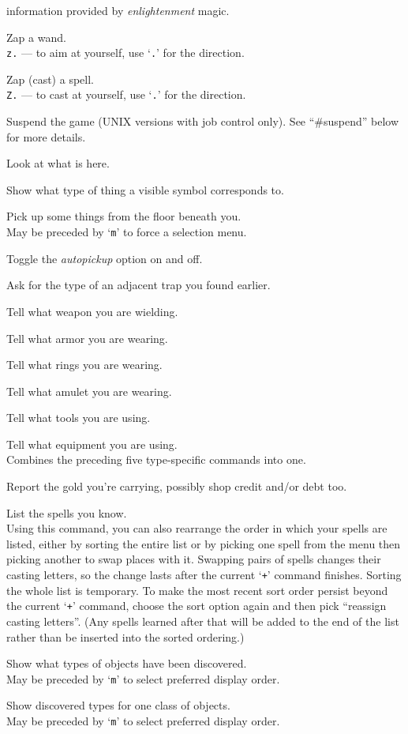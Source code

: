 \documentclass[titlepage]{article}
\begin{document}
\begin{description}[font=\mdseries\ttfamily]
information provided by \textit{enlightenment} magic.
\item[z]
Zap a wand.\\
\texttt{z.} --- to aim at yourself, use `\texttt{.}' for the direction.
\item[Z]
Zap (cast) a spell.\\
\texttt{Z.} --- to cast at yourself, use `\texttt{.}' for the direction.
\item[\textasciicircum Z]
Suspend the game (UNIX versions with job control only).
See ``\#suspend'' below for more details.
\item[:]
Look at what is here.
\item[;]
Show what type of thing a visible symbol corresponds to.
\item[,]
Pick up some things from the floor beneath you.\\
May be preceded by `\texttt{m}' to force a selection menu.
\item[@]
Toggle the \textit{autopickup} option on and off.
\item[\textasciicircum]
Ask for the type of an adjacent trap you found earlier.
\item[)]
Tell what weapon you are wielding.
\item[{]}]
Tell what armor you are wearing.
\item[=]
Tell what rings you are wearing.
\item["]
Tell what amulet you are wearing.
\item[(]
Tell what tools you are using.
\item[*]
Tell what equipment you are using.\\
Combines the preceding five type-specific
commands into one.
\item[\$]
Report the gold you're carrying, possibly shop credit and/or debt too.
\item[+]
List the spells you know.\\
Using this command, you can also rearrange
the order in which your spells are listed, either by sorting the entire
list or by picking one spell from the menu then picking another to swap
places with it.  Swapping pairs of spells changes their casting letters,
so the change lasts after the current `\texttt{+}' command finishes.  Sorting
the whole list is temporary.  To make the most recent sort order persist
beyond the current `\texttt{+}' command, choose the sort option again and then
pick ``reassign casting letters''.  (Any spells learned after that will
be added to the end of the list rather than be inserted into the sorted
ordering.)
\item[\textbackslash]
Show what types of objects have been discovered.
\\
May be preceded by `\texttt{m}' to select preferred display order.
\item[\textasciigrave]
Show discovered types for one class of objects.
\\
May be preceded by `\texttt{m}' to select preferred display order.


\end{description}
\end{document}
